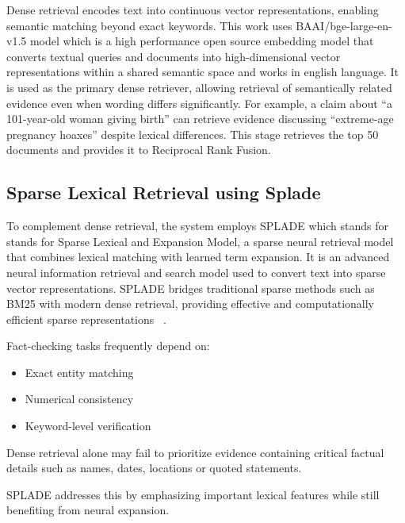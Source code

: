 Dense retrieval encodes text into continuous vector representations, enabling semantic matching beyond exact keywords. This work uses BAAI/bge-large-en-v1.5 model which is a high performance open source embedding model that converts textual queries and documents into high-dimensional vector representations within a shared semantic space and works in english language. It is used as the primary dense retriever, allowing retrieval of semantically related evidence even when wording differs significantly. For example, a claim about “a 101-year-old woman giving birth” can retrieve evidence discussing “extreme-age pregnancy hoaxes” despite lexical differences. This stage retrieves the top 50 documents and provides it to Reciprocal Rank Fusion.


\subsection{Sparse Lexical Retrieval using Splade}
To complement dense retrieval, the system employs SPLADE which stands for stands for  Sparse Lexical and Expansion Model, a sparse neural retrieval model that combines lexical matching with learned term expansion. It is an advanced neural information retrieval and search model used to convert text into sparse vector representations. SPLADE bridges traditional sparse methods such as BM25 with modern dense retrieval, providing effective and computationally efficient sparse representations ~\cite{Formal2021Sep}.

Fact-checking tasks frequently depend on:
\begin{itemize}
    \item Exact entity matching
    \item Numerical consistency
    \item Keyword-level verification
\end{itemize}

Dense retrieval alone may fail to prioritize evidence containing critical factual details such as names, dates, locations or quoted statements.

SPLADE addresses this by emphasizing important lexical features while still benefiting from neural expansion.

